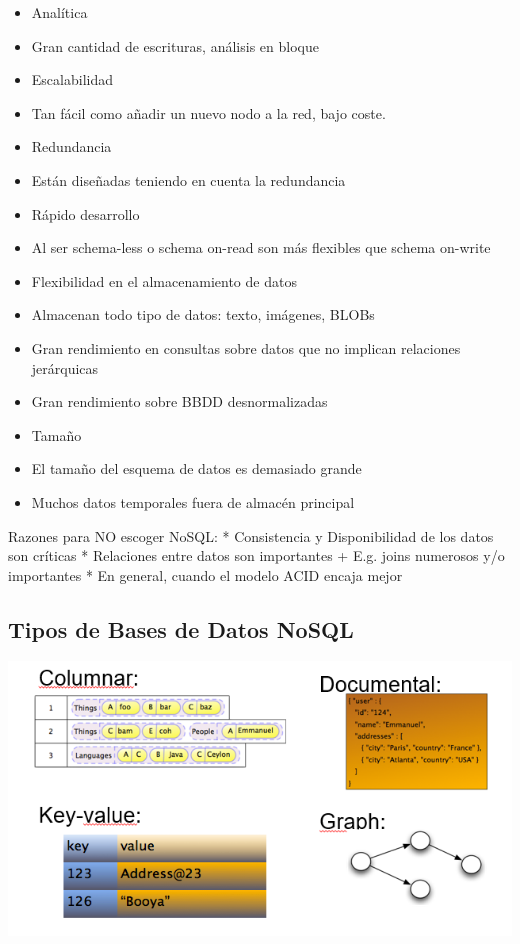 \documentclass[
]{book}
\providecommand{\tightlist}{%
  \setlength{\itemsep}{0pt}\setlength{\parskip}{0pt}}
\begin{document}
\begin{itemize}
\tightlist
\item
  Analítica
\item
  Gran cantidad de escrituras, análisis en bloque
\item
  Escalabilidad
\item
  Tan fácil como añadir un nuevo nodo a la red, bajo coste.
\item
  Redundancia
\item
  Están diseñadas teniendo en cuenta la redundancia
\item
  Rápido desarrollo
\item
  Al ser schema-less o schema on-read son más flexibles que schema on-write
\item
  Flexibilidad en el almacenamiento de datos
\item
  Almacenan todo tipo de datos: texto, imágenes, BLOBs
\item
  Gran rendimiento en consultas sobre datos que no implican relaciones jerárquicas
\item
  Gran rendimiento sobre BBDD desnormalizadas
\item
  Tamaño
\item
  El tamaño del esquema de datos es demasiado grande
\item
  Muchos datos temporales fuera de almacén principal
\end{itemize}

Razones para NO escoger NoSQL:
* Consistencia y Disponibilidad de los datos son críticas
* Relaciones entre datos son importantes
+ E.g. joins numerosos y/o importantes
* En general, cuando el modelo ACID encaja mejor

\subsection{Tipos de Bases de Datos NoSQL}\label{tipos-de-bases-de-datos-nosql}

\includegraphics{images/TiposBBDDNoSQL.png}
\end{document}
